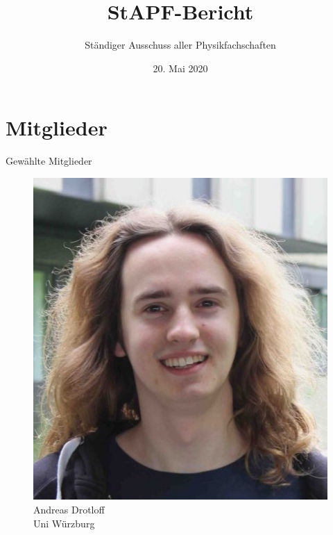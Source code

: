 \documentclass[compress, aspectratio=169]{beamer}
\title[StAPf-Bericht]{StAPF-Bericht}
\author{Ständiger Ausschuss aller Physikfachschaften}
\institute[Zusammenkunft aller Physikfachschaften]
\date{20. Mai 2020}
\begin{document}
\begin{frame}[plain]{}
  \titlepage
\end{frame}

\section{Mitglieder}

\begin{frame}{Gewählte Mitglieder}
  \begin{minipage}{.28\textwidth}
    \begin{figure}
      \begin{minipage}[r]{.57\textwidth}
        \includegraphics[height=0.3\textheight]{andy.jpg}
      \end{minipage} \hfill
      \begin{minipage}[l]{.4\textwidth}
        \caption*{Andreas Drotloff\\Uni Würzburg}
      \end{minipage}
    \end{figure}
  \end{minipage}
\hfill
  \begin{minipage}{.28\textwidth}
    \begin{figure}
      \begin{minipage}[r]{.5\textwidth}

\end{minipage}
\end{figure}
\end{minipage}
\end{frame}
\end{document}
